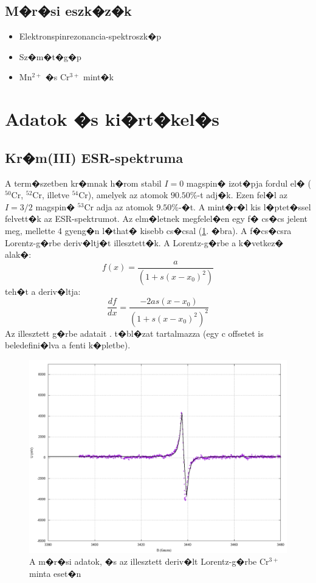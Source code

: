 \documentclass[a4paper,12pt]{article}
\begin{document}
\subsection{M�r�si eszk�z�k}

\begin{itemize}
\item Elektronspinrezonancia-spektroszk�p
\item Sz�m�t�g�p
\item Mn$^{2+}$ �s Cr$^{3+}$ mint�k
\end{itemize}

\section{Adatok �s ki�rt�kel�s}

\subsection{Kr�m(III) ESR-spektruma}

A term�szetben kr�mnak h�rom stabil $I=0$ magspin� izot�pja fordul el� ($^{50}$Cr, $^{52}$Cr, illetve $^{54}$Cr), amelyek az atomok $90.50\%$-t adj�k. Ezen fel�l az $I=3/2$ magspin� $^{53}$Cr adja az atomok $9.50\%$-�t.
A mint�r�l kis l�ptet�ssel felvett�k az ESR-spektrumot. Az elm�letnek megfelel�en egy f� cs�cs jelent meg, mellette 4 gyeng�n l�that� kisebb cs�csal (\ref{fig:1}. �bra). A f�cs�csra Lorentz-g�rbe deriv�ltj�t illesztett�k. A Lorentz-g�rbe a k�vetkez� alak�:
\begin{equation}
f(x) = \frac{a}{(1+s(x-x_0)^2)}
\label{eq:2}
\end{equation}
teh�t a deriv�ltja:
\begin{equation}
\frac{df}{dx} = \frac{-2as(x-x_0)}{(1+s(x-x_0)^2)^2}
\label{eq:3}
\end{equation}
Az illesztett g�rbe adatait . t�bl�zat tartalmazza (egy c offsetet is beledefini�lva a fenti k�pletbe).

\begin{figure}[H]
\includegraphics[width=15cm]{Cr.png}
\centering
\caption{A m�r�si adatok, �s az illesztett deriv�lt Lorentz-g�rbe Cr$^{3+}$ minta eset�n}
\label{fig:1}
\end{figure}
\end{document}
